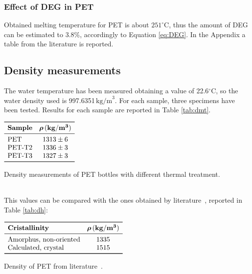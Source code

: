 \documentclass[a4paper, 11pt]{article}
\begin{document}
\subsubsection{Effect of DEG in PET}

Obtained melting temperature for PET is about $251^\circ$C, thus the amount of DEG can be estimated to 3.8\%, accordingly to Equation \ref{eq:DEG}. In the Appendix a table from the literature is reported.

\subsection{Density measurements}

The water temperature has been measured  obtaining a value of 22.6$^\circ$C, so the water density used is 997.6351$\, \text{kg/m}^{3}$. For each sample, three specimens have been tested. Results for each sample are reported in Table \ref{tab:dmt}. 
\begin{table}[htp]
\centering
$
\begin{array}{lcc}
\toprule
\textbf{Sample} & \boldsymbol{\rho}\,(\mathbf{kg/m^{3}})\\
\midrule
\text{PET} & 1313\pm 6\\
\text{PET-T2} & 1336\pm 3 \\
\text{PET-T3} & 1327\pm 3 \\
\bottomrule
\end{array}
$
\caption{Density measurements of PET bottles with different thermal treatment.}
\label{tab:dmt}
\end{table}\\
This values can be compared with the ones obtained by literature~\cite{handbook}, reported in Table \ref{tab:dh}:
\begin{table}[htp]
\centering
$
\begin{array}{lc}
\toprule
\textbf{Cristallinity} & \boldsymbol{\rho}\,(\mathbf{kg/m^{3}})\\
\midrule
\text{Amorphus, non-oriented} & 1335\\
\text{Calculated, crystal} & 1515 \\
\bottomrule
\end{array}
$
\caption{Density of PET from literature~\cite{handbook}.}
\label{tab:dh}
\end{table}
\end{document}
